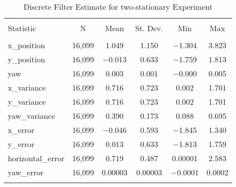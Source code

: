 
\begin{table}[h] \centering 
  \caption{Discrete Filter Estimate for two-stationary Experiment} 
  \label{tab:two_stationary_discrete_summary} 
\begin{tabular}{@{\extracolsep{5pt}}lccccc} 
\\[-1.8ex]\hline 
\hline \\[-1.8ex] 
Statistic & \multicolumn{1}{c}{N} & \multicolumn{1}{c}{Mean} & \multicolumn{1}{c}{St. Dev.} & \multicolumn{1}{c}{Min} & \multicolumn{1}{c}{Max} \\ 
\hline \\[-1.8ex] 
x\_position & 16,099 & 1.049 & 1.150 & $-$1.304 & 3.823 \\ 
y\_position & 16,099 & $-$0.013 & 0.633 & $-$1.759 & 1.813 \\ 
yaw & 16,099 & 0.003 & 0.001 & $-$0.000 & 0.005 \\ 
x\_variance & 16,099 & 0.716 & 0.723 & 0.002 & 1.701 \\ 
y\_variance & 16,099 & 0.716 & 0.723 & 0.002 & 1.701 \\ 
yaw\_variance & 16,099 & 0.390 & 0.173 & 0.088 & 0.695 \\ 
x\_error & 16,099 & $-$0.046 & 0.593 & $-$1.845 & 1.340 \\ 
y\_error & 16,099 & 0.013 & 0.633 & $-$1.813 & 1.759 \\ 
horizontal\_error & 16,099 & 0.719 & 0.487 & 0.00001 & 2.583 \\ 
yaw\_error & 16,099 & 0.00003 & 0.00003 & $-$0.0001 & 0.0002 \\ 
\hline \\[-1.8ex] 
\end{tabular} 
\end{table} 
